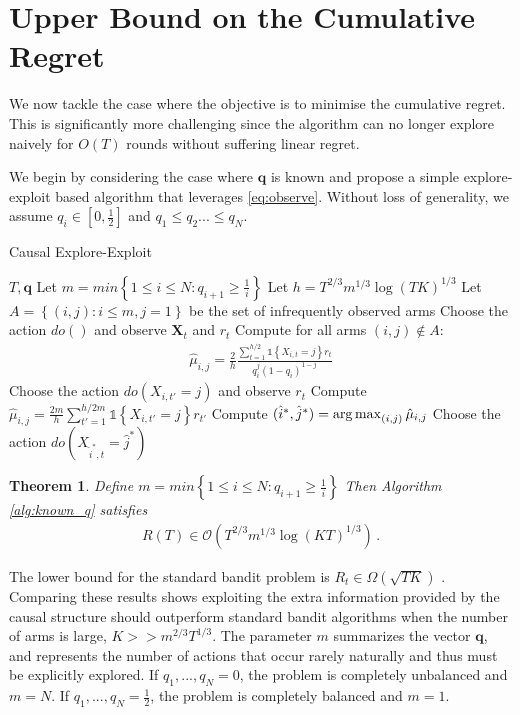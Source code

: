 \documentclass{article}
\newcommand{\set}[1]{\left\{#1\right\}}
\newcommand{\ind}[1]{\mathds{1}\!\!\set{#1}}
\newcommand{\argmax}{\operatornamewithlimits{arg\,max}}
\newcommand{\eq}[1]{\begin{align*}#1\end{align*}}
\newcommand{\bigo}[1]{\mathcal{O}\left( #1 \right)}
\newcommand{\bigomega}[1]{\Omega\left( #1 \right)}
\theoremstyle{plain}
\newtheorem{theorem}{Theorem}
\theoremstyle{definition}
\begin{document}
\section{Upper Bound on the Cumulative Regret}

We now tackle the case where the objective is to minimise the cumulative regret.
This is significantly more challenging since the algorithm can no longer explore naively for $O(T)$ rounds without suffering linear regret.

We begin by considering the case where $\boldsymbol{q}$ is known and propose a simple explore-exploit based algorithm that leverages  \eqref{eq:observe}. Without loss of generality, we assume $q_i \in [0,\frac{1}{2}]$ and $q_1 \leq q_2 ... \leq q_N$. 

\begin{algorithm}[h]
   \caption{Causal Explore-Exploit}
   \label{alg:known_q}
\begin{algorithmic}
    $T,\boldsymbol{q}$
   \STATE Let $m =   min\set{1 \leq i \leq N:q_{i+1} \geq \frac{1}{i}}$
   \STATE Let $h = T^{2/3}m^{1/3} \log(TK)^{1/3}$
   \STATE Let $A = \set{(i,j) : i \leq m, j = 1}$ be the set of infrequently observed arms
   \STATE Choose the action $do()$ and observe $\boldsymbol{X}_t$ and $r_t$
   \ENDFOR
   \STATE Compute for all arms $(i,j) \notin A$:
   \eq{
   \hat{\mu}_{i,j} = \frac{2}{h}\frac{\sum_{t=1}^{h/2}\ind{X_{i,t}=j}r_t}{q_i^j(1-q_i)^{1-j}}
   }
    \STATE Choose the action $do(X_{i,t'} = j)$ and observe $r_t$
    \ENDFOR
    \STATE Compute $\hat{\mu}_{i,j} = \frac{2m}{h}\sum_{t'=1}^{h/2m}\ind{X_{i,t'} = j}r_{t'}$
   \ENDFOR
   \STATE Compute $(\hat{i}^*,\hat{j}^*) = \argmax_{(i,j)} \hat{\mu}_{i,j}$
   \STATE Choose the action $do(X_{\hat{i}^*,t} = \hat{j}^*)$
   \ENDFOR
\end{algorithmic}
\end{algorithm}

\begin{theorem}\label{thm:known_q_regret}
Define $m =   min\set{1 \leq i \leq N:q_{i+1} \geq \frac{1}{i}}$
Then Algorithm \ref{alg:known_q} satisfies
\eq{
R(T) \in \bigo{T^{2/3}m^{1/3} \log(KT)^{1/3}}\,.
}
\end{theorem}

The lower bound for the standard bandit problem is $R_t \in \bigomega{\sqrt{TK}}$ \cite{Auer1995}. Comparing these results shows exploiting the extra information provided by the causal structure should outperform standard bandit algorithms when the number of arms is large, $K >> m^{2/3}T^{1/3}$. The parameter $m$ summarizes the vector $\boldsymbol{q}$, and represents the number of actions that occur rarely naturally and thus must be explicitly explored. If $q_1,...,q_N = 0$, the problem is completely unbalanced and $m = N$. If $q_1,...,q_N = \frac{1}{2}$, the problem is completely balanced and $m = 1$.
\end{document}
